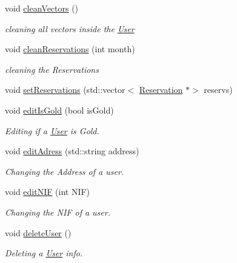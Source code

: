 \begin{DoxyCompactItemize}
\mbox{\label{class_user_a3ccbaec58dd37260a34dfa84496b30bd}} 
void \mbox{\hyperlink{class_user_a3ccbaec58dd37260a34dfa84496b30bd}{clean\+Vectors}} ()
\begin{DoxyCompactList}\small\item\em cleaning all vectors inside the \mbox{\hyperlink{class_user}{User}} \end{DoxyCompactList}\item 
\mbox{\label{class_user_a384f5eadff91f30d760d7e762628ba75}} 
void \mbox{\hyperlink{class_user_a384f5eadff91f30d760d7e762628ba75}{clean\+Reservations}} (int month)
\begin{DoxyCompactList}\small\item\em cleaning the Reservations \end{DoxyCompactList}\item 
void \mbox{\hyperlink{class_user_a69d12edf2fb136601b7b9558f1c7b1e2}{set\+Reservations}} (std\+::vector$<$ \mbox{\hyperlink{class_reservation}{Reservation}} $\ast$$>$ reservs)
\item 
void \mbox{\hyperlink{class_user_a092c80f086767a8c204320b6517bfc58}{edit\+Is\+Gold}} (bool is\+Gold)
\begin{DoxyCompactList}\small\item\em Editing if a \mbox{\hyperlink{class_user}{User}} is Gold. \end{DoxyCompactList}\item 
void \mbox{\hyperlink{class_user_a9d826d552e81ecc17828be848e02519b}{edit\+Adress}} (std\+::string address)
\begin{DoxyCompactList}\small\item\em Changing the Address of a user. \end{DoxyCompactList}\item 
void \mbox{\hyperlink{class_user_a470738d77c8d53ab5c41cdcd74497a82}{edit\+N\+IF}} (int N\+IF)
\begin{DoxyCompactList}\small\item\em Changing the N\+IF of a user. \end{DoxyCompactList}\item 
\mbox{\label{class_user_ab29f666469897568a6c592869cc0a4f9}} 
void \mbox{\hyperlink{class_user_ab29f666469897568a6c592869cc0a4f9}{delete\+User}} ()
\begin{DoxyCompactList}\small\item\em Deleting a \mbox{\hyperlink{class_user}{User}} info. \end{DoxyCompactList}\item 
$$
\end{DoxyCompactItemize}
